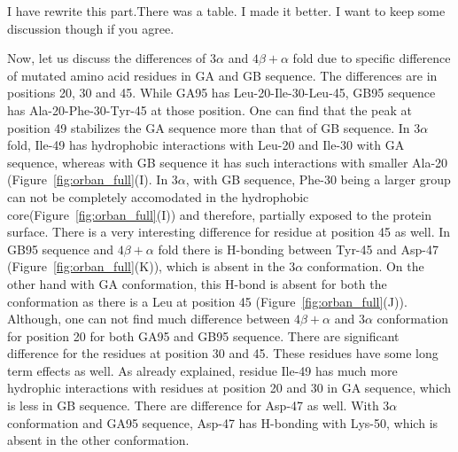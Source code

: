 \documentclass[12pt]{article}
\newcommand{\Arijit}[1]{\color{magenta}#1\normalcolor}
\begin{document}
\Arijit{I have rewrite this part.There was a table. I made it better. I want to keep some discussion though if you agree.}

 
Now, let us discuss the differences of $3 \alpha$ and $4 \beta + \alpha$ fold due to specific difference of mutated amino acid 
residues in GA and GB sequence. The differences are in positions 20, 30 and 45. While GA95 has Leu-20-Ile-30-Leu-45, GB95 sequence 
has Ala-20-Phe-30-Tyr-45 at those position. One can find that the peak at position 49 stabilizes the GA sequence more than that of GB
sequence. In $3 \alpha$ fold, Ile-49 has hydrophobic interactions with Leu-20 and Ile-30 with GA sequence, whereas with GB sequence it 
has such interactions with smaller Ala-20 (Figure~\ref{fig:orban_full}(I). In $3 \alpha$, with GB sequence, Phe-30 
being a larger group can not be completely accomodated in the hydrophobic core(Figure~\ref{fig:orban_full}(I)) and therefore, 
partially exposed to the protein surface. There is a very interesting difference for residue at position 45 as well. In GB95 sequence
and $4 \beta + \alpha$ fold there is H-bonding between Tyr-45 and Asp-47 (Figure~\ref{fig:orban_full}(K)), which is absent in the
$3 \alpha$ conformation. On the other hand with GA conformation, this H-bond is absent for both the conformation as there is a Leu at position
45 (Figure~\ref{fig:orban_full}(J)). Although, one can not find much difference between $4 \beta + \alpha$ and $3 \alpha$ conformation
for position 20 for both GA95 and GB95 sequence. There are significant difference for the residues at position 30 and 45.  
These residues have some long term effects as well. As already explained, residue Ile-49 has much more hydrophic interactions with residues
at position 20 and 30 in GA sequence, which is less in GB sequence. There are difference for Asp-47 as well. With $3 \alpha$ conformation 
and GA95 sequence, Asp-47 has H-bonding with Lys-50, which is absent in the other conformation.    
      
\end{document}
